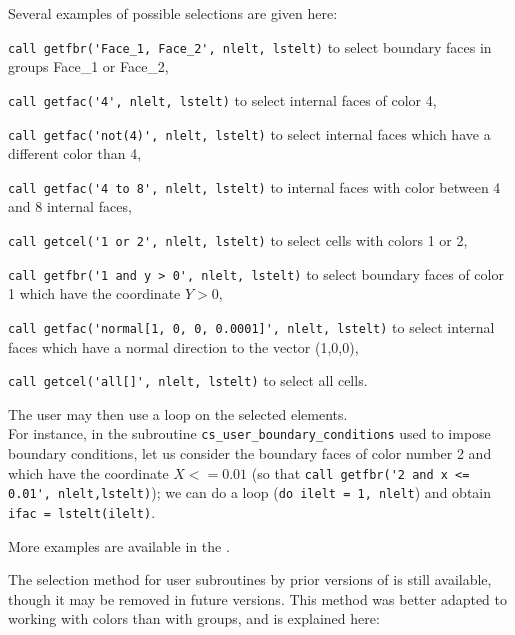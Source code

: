 {{{{Several examples of possible selections are given here:
\begin{list}{-}{}
\item \verb+call getfbr('Face_1, Face_2', nlelt, lstelt)+ to select
  boundary faces in groups Face\_1 or Face\_2,
\item \verb+call getfac('4', nlelt, lstelt)+ to select internal
  faces of color 4,
\item \verb+call getfac('not(4)', nlelt, lstelt)+ to select internal
  faces which have a different color than 4,
\item \verb+call getfac('4 to 8', nlelt, lstelt)+ to internal faces
with color between 4 and 8 internal faces,
\item \verb+call getcel('1 or 2', nlelt, lstelt)+ to select cells
  with colors 1 or 2,
\item \verb+call getfbr('1 and y > 0', nlelt, lstelt)+ to select boundary
  faces of color 1 which have the coordinate $Y > 0$,
\item \verb+call getfac('normal[1, 0, 0, 0.0001]', nlelt, lstelt)+ to select
internal faces which have a normal direction to the vector (1,0,0),
\item \verb+call getcel('all[]', nlelt, lstelt)+ to select all cells.
\end{list}

The user may then use a loop on the selected elements.\\
For instance, in the subroutine \texttt{cs\_user\_boundary\_conditions} used to impose
boundary  conditions, let us consider the boundary faces of color
number 2 and which have the coordinate $X <= 0.01$
(so that \verb+call getfbr('2 and x <= 0.01', nlelt,lstelt)+);
we can do a loop (\verb+do ilelt = 1, nlelt+) and
obtain \verb+ifac = lstelt(ilelt)+.

More examples are available in the .


The selection method for user subroutines by prior versions of \CS
is still available, though it may be removed in future versions.
This method was better adapted to working with colors than with groups,
and is explained here:

}}}}
